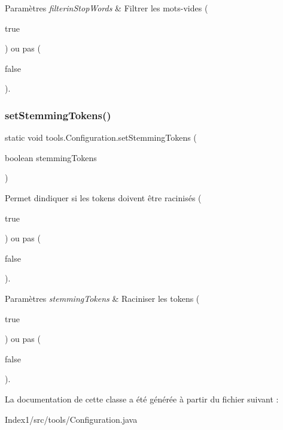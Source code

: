 \begin{DoxyParams}{Paramètres}
{\em filterin\+Stop\+Words} & Filtrer les mots-\/vides (
\begin{DoxyCode}
\textcolor{keyword}{true} 
\end{DoxyCode}
 ) ou pas (
\begin{DoxyCode}
\textcolor{keyword}{false} 
\end{DoxyCode}
 ). \\
\hline
\end{DoxyParams}
\mbox{\label{classtools_1_1Configuration_abe7544ea6ecb6c021fb2ac309bc59fbf}} 
\subsubsection{\texorpdfstring{set\+Stemming\+Tokens()}{setStemmingTokens()}}
{\footnotesize\ttfamily static void tools.\+Configuration.\+set\+Stemming\+Tokens (\begin{DoxyParamCaption}\item[{boolean}]{stemming\+Tokens }\end{DoxyParamCaption})\hspace{0.3cm}{\ttfamily [static]}}

Permet d\textquotesingle{}indiquer si les tokens doivent être racinisés (
\begin{DoxyCode}
\textcolor{keyword}{true} 
\end{DoxyCode}
 ) ou pas (
\begin{DoxyCode}
\textcolor{keyword}{false} 
\end{DoxyCode}
 ).


\begin{DoxyParams}{Paramètres}
{\em stemming\+Tokens} & Raciniser les tokens (
\begin{DoxyCode}
\textcolor{keyword}{true} 
\end{DoxyCode}
 ) ou pas (
\begin{DoxyCode}
\textcolor{keyword}{false} 
\end{DoxyCode}
 ). \\
\hline
\end{DoxyParams}


La documentation de cette classe a été générée à partir du fichier suivant \+:\begin{DoxyCompactItemize}
\item 
Index1/src/tools/Configuration.\+java\end{DoxyCompactItemize}
